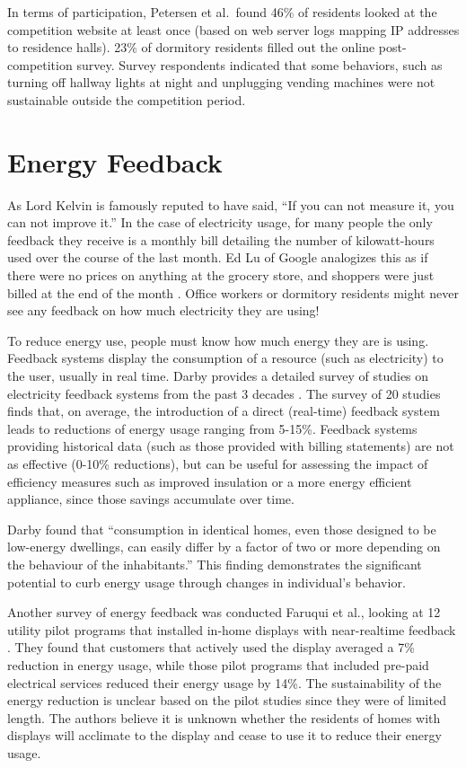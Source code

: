 In terms of participation, Petersen et al.\ found 46\% of residents looked at the competition website at least once (based on web server logs mapping IP addresses to residence halls). 23\% of dormitory residents filled out the online post-competition survey. Survey respondents indicated that some behaviors, such as turning off hallway lights at night and unplugging vending machines were not sustainable outside the competition period.


\section{Energy Feedback}
\label{sec:energy-feedback}

As Lord Kelvin is famously reputed to have said, ``If you can not measure it, you can not improve it.'' In the case of electricity usage, for many people the only feedback they receive is a monthly bill detailing the number of kilowatt-hours used over the course of the last month. Ed Lu of Google analogizes this as if there were no prices on anything at the grocery store, and shoppers were just billed at the end of the month \cite{Helft2008Googles-Energy}. Office workers or dormitory residents might never see any feedback on how much electricity they are using!

To reduce energy use, people must know how much energy they are is using. Feedback systems display the consumption of a resource (such as electricity) to the user, usually in real time. Darby provides a detailed survey of studies on electricity feedback systems from the past 3 decades \cite{darby-review-2006}. The survey of 20 studies finds that, on average, the introduction of a direct (real-time) feedback system leads to reductions of energy usage ranging from 5-15\%. Feedback systems providing historical data (such as those provided with billing statements) are not as effective (0-10\% reductions), but can be useful for assessing the impact of efficiency measures such as improved insulation or a more energy efficient appliance, since those savings accumulate over time.

Darby found that ``consumption in identical homes, even those designed to be low-energy dwellings, can easily differ by a factor of two or more depending on the behaviour of the inhabitants.'' This finding demonstrates the significant potential to curb energy usage through changes in individual's behavior.

Another survey of energy feedback was conducted Faruqui et al., looking at 12 utility pilot programs that installed in-home displays with near-realtime feedback \cite{Faruqui09}. They found that customers that actively used the display averaged a 7\% reduction in energy usage, while those pilot programs that included pre-paid electrical services reduced their energy usage by 14\%. The sustainability of the energy reduction is unclear based on the pilot studies since they were of limited length. The authors believe it is unknown whether the residents of homes with displays will acclimate to the display and cease to use it to reduce their energy usage.

